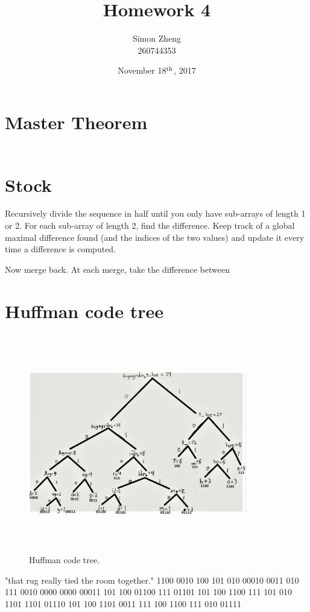 \documentclass[11pt,letterpaper]{article}
\author{Simon Zheng\\260744353}
\title{Homework 4}
\date{November 18$^{\textnormal{th}}$, 2017}
\begin{document}
	\maketitle
	\thispagestyle{fancy}
	
	\section{Master Theorem}
		\begin{align*}
			\
		\end{align*}
	
	\section{Stock}
		Recursively divide the sequence in half until you only have sub-arrays of length 1 or 2.
		For each sub-array of length 2, find the difference.
		Keep track of a global maximal difference found (and the indices of the two values) and update it every time a difference is computed.
		
		Now merge back.
		At each merge, take the difference between
		
	\section{Huffman code tree}
		\begin{figure}[h]
			\centering
			\includegraphics[width=360px,height=360px,keepaspectratio]{huffmancodetree.jpg}
			\linespread{0.8}\caption{Huffman code tree.}
		\end{figure}
		"that rug really tied the room together."
		 1100 0010 100 101 010 00010 0011 010 111 0010 0000 0000 00011 101 100 01100 111 01101 101 100 1100 111 101 010 1101 1101 01110 101 100 1101 0011 111 100 1100 111 010 01111
	
\end{document}
